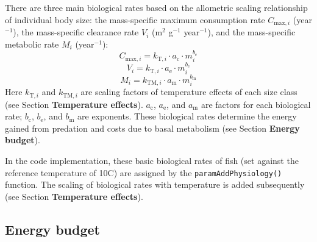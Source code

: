 \documentclass[
]{article}
\begin{document}
There are three main biological rates based on the allometric scaling
relationship of individual body size: the mass-specific maximum
consumption rate \(C_{\mathrm{max},i}\) (year\(^{-1}\)), the
mass-specific clearance rate \(V_{i}\) (m\(^{2}\) g\(^{-1}\)
year\(^{-1}\)), and the mass-specific metabolic rate \(M_i\)
(year\(^{-1}\)): \begin{equation}
C_{\mathrm{max},i} = k_{\mathrm{T},i} \cdot a_{\mathrm{c}} \cdot m_{i}^{b_{\mathrm{c}}}  \label{eq:maxconsump}
\end{equation} \begin{equation}
V_{i} = k_{\mathrm{T},i} \cdot a_{\mathrm{e}} \cdot m_{i}^{b_{\mathrm{e}}}      \label{eq:clearance}
\end{equation} \begin{equation}
M_i = k_{\mathrm{TM},i} \cdot a_{\mathrm{m}} \cdot m_{i}^{b_{\mathrm{m}}}       \label{eq:metabolism}
\end{equation} Here \(k_{\mathrm{T},i}\) and \(k_{\mathrm{TM},i}\) are
scaling factors of temperature effects of each size class (see Section
\textbf{Temperature effects}). \(a_{\mathrm{c}}\), \(a_{\mathrm{e}}\),
and \(a_{\mathrm{m}}\) are factors for each biological rate;
\(b_{\mathrm{c}}\), \(b_{\mathrm{e}}\), and \(b_{\mathrm{m}}\) are
exponents. These biological rates determine the energy gained from
predation and costs due to basal metabolism (see Section \textbf{Energy
budget}).

In the code implementation, these basic biological rates of fish (set
against the reference temperature of 10\textdegree{}C) are assigned by
the \texttt{paramAddPhysiology()} function. The scaling of biological
rates with temperature is added subsequently (see Section
\textbf{Temperature effects}).

\subsection{Energy budget}\label{energy-budget}
\end{document}
